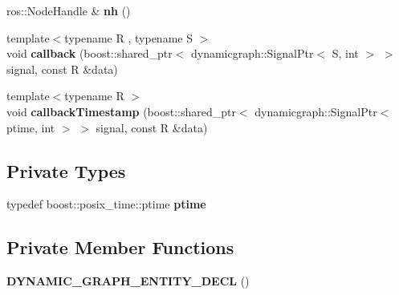 \begin{DoxyCompactItemize}
\item 
ros\+::\+Node\+Handle \& {\bfseries nh} ()\hypertarget{classdynamic__graph_1_1RosSubscribe_a093c394243939de8a085ae774ad05493}{}\label{classdynamic__graph_1_1RosSubscribe_a093c394243939de8a085ae774ad05493}

\item 
{\footnotesize template$<$typename R , typename S $>$ }\\void {\bfseries callback} (boost\+::shared\+\_\+ptr$<$ dynamicgraph\+::\+Signal\+Ptr$<$ S, int $>$ $>$ signal, const R \&data)\hypertarget{classdynamic__graph_1_1RosSubscribe_acdf8089899afd8364f75ac2b70b3269f}{}\label{classdynamic__graph_1_1RosSubscribe_acdf8089899afd8364f75ac2b70b3269f}

\item 
{\footnotesize template$<$typename R $>$ }\\void {\bfseries callback\+Timestamp} (boost\+::shared\+\_\+ptr$<$ dynamicgraph\+::\+Signal\+Ptr$<$ ptime, int $>$ $>$ signal, const R \&data)\hypertarget{classdynamic__graph_1_1RosSubscribe_a6cb2a713a53d3cbebeeac921ba245954}{}\label{classdynamic__graph_1_1RosSubscribe_a6cb2a713a53d3cbebeeac921ba245954}

\end{DoxyCompactItemize}
\subsection*{Private Types}
\begin{DoxyCompactItemize}
\item 
typedef boost\+::posix\+\_\+time\+::ptime {\bfseries ptime}\hypertarget{classdynamic__graph_1_1RosSubscribe_a78c93ebf092b3e232d8db27e1ae0225f}{}\label{classdynamic__graph_1_1RosSubscribe_a78c93ebf092b3e232d8db27e1ae0225f}

\end{DoxyCompactItemize}
\subsection*{Private Member Functions}
\begin{DoxyCompactItemize}
\item 
{\bfseries D\+Y\+N\+A\+M\+I\+C\+\_\+\+G\+R\+A\+P\+H\+\_\+\+E\+N\+T\+I\+T\+Y\+\_\+\+D\+E\+CL} ()\hypertarget{classdynamic__graph_1_1RosSubscribe_adb61288448d5efe7bc73cc78b9bad700}{}\label{classdynamic__graph_1_1RosSubscribe_adb61288448d5efe7bc73cc78b9bad700}

\end{DoxyCompactItemize}
